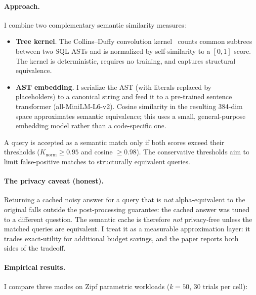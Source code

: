 \documentclass[sigconf,nonacm]{acmart}
\begin{document}
\paragraph{Approach.}
I combine two complementary semantic similarity measures:

\begin{itemize}
    \item \textbf{Tree kernel}. The Collins--Duffy convolution kernel~\cite{collins2001convolution} counts common subtrees between two SQL ASTs and is normalized by self-similarity to a $[0,1]$ score. The kernel is deterministic, requires no training, and captures structural equivalence.
    \item \textbf{AST embedding}. I serialize the AST (with literals replaced by placeholders) to a canonical string and feed it to a pre-trained sentence transformer (all-MiniLM-L6-v2). Cosine similarity in the resulting 384-dim space approximates semantic equivalence; this uses a small, general-purpose embedding model rather than a code-specific one.
\end{itemize}

A query is accepted as a semantic match only if both scores exceed their thresholds ($K_{\mathrm{norm}} \geq 0.95$ and cosine $\geq 0.98$). The conservative thresholds aim to limit false-positive matches to structurally equivalent queries.

\paragraph{The privacy caveat (honest).}
Returning a cached noisy answer for a query that is \emph{not} alpha-equivalent to the original falls outside the post-processing guarantee: the cached answer was tuned to a different question. The semantic cache is therefore \emph{not} privacy-free unless the matched queries are equivalent. I treat it as a measurable approximation layer: it trades exact-utility for additional budget savings, and the paper reports both sides of the tradeoff.

\paragraph{Empirical results.}
I compare three modes on Zipf parametric workloads ($k=50$, 30 trials per cell):
\end{document}
